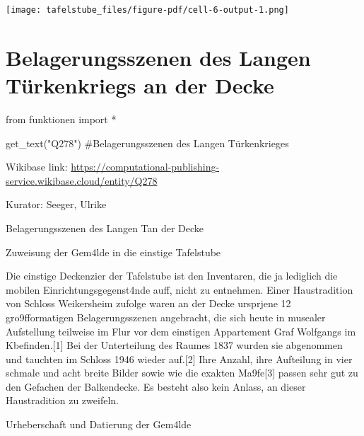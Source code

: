 \documentclass[
  letterpaper,
]{book}
\newenvironment{Shaded}{\begin{snugshade}}{\end{snugshade}}
\newcommand{\CommentTok}[1]{\textcolor[rgb]{0.37,0.37,0.37}{#1}}
\newcommand{\ImportTok}[1]{\textcolor[rgb]{0.00,0.46,0.62}{#1}}
\newcommand{\NormalTok}[1]{\textcolor[rgb]{0.00,0.23,0.31}{#1}}
\newcommand{\OperatorTok}[1]{\textcolor[rgb]{0.37,0.37,0.37}{#1}}
\newcommand{\StringTok}[1]{\textcolor[rgb]{0.13,0.47,0.30}{#1}}
\begin{document}
\texttt{[image: tafelstube\_files/figure-pdf/cell-6-output-1.png]}


\chapter{Belagerungsszenen des Langen Türkenkriegs an der
Decke}\label{belagerungsszenen-des-langen-tuxfcrkenkriegs-an-der-decke}

\begin{Shaded}
\begin{Highlighting}[]
\ImportTok{from}\NormalTok{ funktionen }\ImportTok{import} \OperatorTok{*}
\end{Highlighting}
\end{Shaded}

\begin{Shaded}
\begin{Highlighting}[]
\NormalTok{get\_text(}\StringTok{"Q278"}\NormalTok{)}
\CommentTok{\#Belagerungsszenen des Langen Türkenkrieges}
\end{Highlighting}
\end{Shaded}

Wikibase link:
\url{https://computational-publishing-service.wikibase.cloud/entity/Q278}

Kurator: Seeger, Ulrike

Belagerungsszenen des Langen T\xbcrkenkriegs an der Decke

Zuweisung der Gem\xa4lde in die einstige Tafelstube

Die einstige Deckenzier der Tafelstube ist den Inventaren, die ja
lediglich die mobilen Einrichtungsgegenst\xa4nde auff\xbchren,
nicht zu entnehmen. Einer Haustradition von Schloss Weikersheim zufolge
waren an der Decke urspr\xbcnglich jene 12 gro\x9fformatigen
Belagerungsszenen angebracht, die sich heute in musealer Aufstellung
teilweise im Flur vor dem einstigen Appartement Graf Wolfgangs im
K\xbcchenbau befinden.{[}1{]} Bei der Unterteilung des Raumes 1837
wurden sie abgenommen und tauchten im Schloss 1946 wieder auf.{[}2{]}
Ihre Anzahl, ihre Aufteilung in vier schmale und acht breite Bilder
sowie wie die exakten Ma\x9fe{[}3{]} passen sehr gut zu den Gefachen
der Balkendecke. Es besteht also kein Anlass, an dieser Haustradition zu
zweifeln.

Urheberschaft und Datierung der Gem\xa4lde
\end{document}
